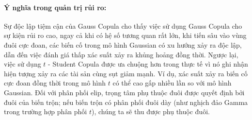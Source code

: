 \paragraph{Ý nghĩa trong quản trị rủi ro:}
Sự độc lập tiệm cận của Gauss Copula cho thấy việc sử dụng Gauss Copula cho sự kiện rủi ro cao, ngay cả khi có hệ số tương quan rất lớn, khi tiến sâu vào vùng đuôi cực đoan, các biến cố trong mô hình Gaussian có xu hướng xảy ra độc lập, dẫn đến việc đánh giá thấp xác suất xảy ra khủng hoảng đồng thời. Ngược lại, việc sử dụng $t$ - Student Copula được ưa chuộng hơn trong thực tế vì nó ghi nhận hiện tượng xảy ra các tài sản cùng sụt giảm mạnh. Ví dụ, xác suất xảy ra biến cố cực đoan đồng thời trong mô hình $t$ có thể cao gấp nhiều lần so với mô hình Gaussian. Đối với phân phối elip, trọng tâm phụ thuộc đuôi được quyết định bởi đuôi của biến trộn; nếu biến trộn có phân phối đuôi dày (như nghịch đảo Gamma trong trường hợp phân phối $t$), chúng ta sẽ thu được phụ thuộc đuôi.
